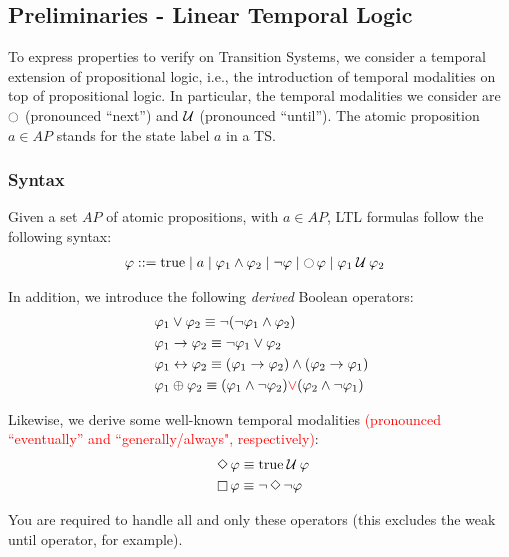 \documentclass{article}
\begin{document}
\subsection{Preliminaries - Linear Temporal Logic}
\label{subsec-ltl}
To express properties to verify on Transition Systems, we consider a temporal extension of propositional logic, i.e., 
the introduction of temporal modalities on top of propositional logic. In particular, the temporal
modalities we consider are $\ocircle$ (pronounced ``next'') and $\mathbin{\mathcal{U}}$ (pronounced ``until'').
The atomic proposition $a \in AP$ stands for the state label $a$ in a TS.

\subsubsection*{Syntax}
Given a set $AP$ of atomic propositions, with $a \in AP$, LTL formulas follow the following syntax: 
\begin{align*}
    &\; \varphi ::= \text{true} \mid a \mid \varphi_1 \land \varphi_2 \mid \neg \varphi \mid \mathop{\ocircle}{\varphi} \mid \varphi_1 \mathbin{\mathcal{U}} \varphi_2
\end{align*}

In addition, we introduce the following \emph{derived} Boolean operators: 
\begin{align*}
    &\; \varphi_1 \lor \varphi_2 \equiv \neg (\neg \varphi_1 \land \varphi_2) \\
    &\; \varphi_1 \rightarrow \varphi_2 \equiv \neg \varphi_1 \lor \varphi_2 \\
    &\; \varphi_1 \leftrightarrow  \varphi_2 \equiv (\varphi_1 \rightarrow \varphi_2) \land (\varphi_2 \rightarrow \varphi_1) \\
    &\; \varphi_1 \oplus  \varphi_2 \equiv (\varphi_1 \land \neg \varphi_2) \textcolor{red}{\lor} (\varphi_2 \land \neg \varphi_1)\\
\end{align*}

Likewise, we derive some well-known temporal modalities \textcolor{red}{(pronounced ``eventually'' and ``generally/always", respectively)}:
\begin{align*}
    &\; \mathop{\Diamond} \varphi \equiv \text{true} \mathbin{\mathcal{U}} \varphi \\
    &\; \mathop{\square} \varphi \equiv \neg \mathop{\Diamond} \neg \varphi \\
\end{align*}

You are required to handle all and only these operators (this excludes the weak until operator, for example).
\end{document}
